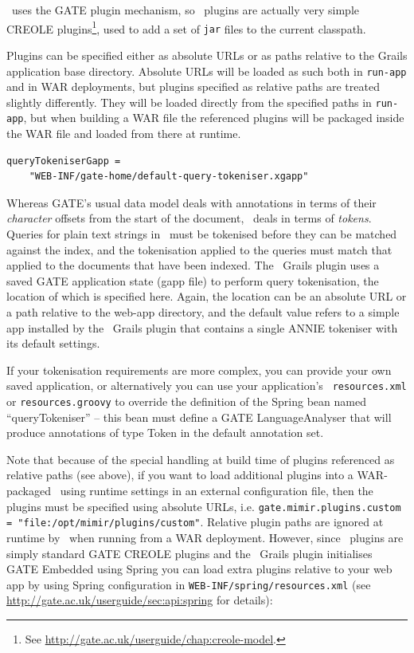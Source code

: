 \Mimir\ uses the GATE plugin mechanism, so \Mimir\ plugins are actually
very simple CREOLE plugins\footnote{See
\url{http://gate.ac.uk/userguide/chap:creole-model}.}, used to add a set of
{\tt jar} files to the current classpath.
 
Plugins can be specified either as absolute URLs or as paths relative to the
Grails application base directory.  Absolute URLs will be loaded as such both
in {\tt run-app} and in WAR deployments, but plugins specified as relative
paths are treated slightly differently.  They will be loaded directly from the
specified paths in {\tt run-app}, but when building a WAR file the referenced
plugins will be packaged inside the WAR file and loaded from there at runtime.

\begin{lstlisting}
queryTokeniserGapp = 
    "WEB-INF/gate-home/default-query-tokeniser.xgapp"
\end{lstlisting}

Whereas GATE's usual data model deals with annotations in terms of their {\em
character} offsets from the start of the document, \Mimir\ deals in terms of
{\em tokens}.  Queries for plain text strings in \Mimir\ must be tokenised
before they can be matched against the index, and the tokenisation applied to
the queries must match that applied to the documents that have been indexed.
The \Mimir\ Grails plugin uses a saved GATE application state (gapp file) to
perform query tokenisation, the location of which is specified here.  Again,
the location can be an absolute URL or a path relative to the web-app
directory, and the default value refers to a simple app installed by the
\Mimir\ Grails plugin that contains a single ANNIE tokeniser with its default
settings.

If your tokenisation requirements are more complex, you can provide your own
saved application, or alternatively you can use your application's {\tt
resources.xml} or {\tt resources.groovy} to override the definition of the
Spring bean named ``queryTokeniser'' -- this bean must define a GATE
LanguageAnalyser that will produce annotations of type Token in the default
annotation set.

Note that because of the special handling at build time of plugins referenced
as relative paths (see above), if you want to load additional plugins into a
WAR-packaged \Mimir\ using runtime settings in an external configuration file,
then the plugins must be specified using absolute URLs, i.e.
{\tt gate.mimir.plugins.custom = "file:/opt/mimir/plugins/custom"}.  Relative
plugin paths are ignored at runtime by \Mimir\ when running from a WAR
deployment.  However, since \Mimir\ plugins are simply standard GATE CREOLE
plugins and the \Mimir\ Grails plugin initialises GATE Embedded using Spring
you can load extra plugins relative to your web app by using Spring
configuration in {\tt WEB-INF/spring/resources.xml} (see
\url{http://gate.ac.uk/userguide/sec:api:spring} for details):


